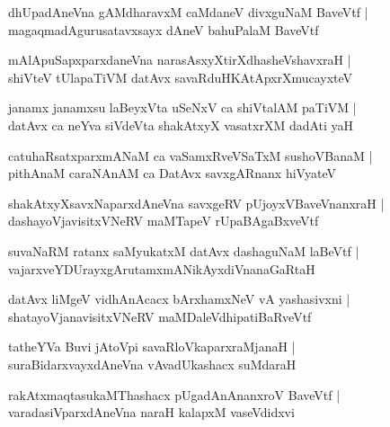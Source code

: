 \documentclass[twoside,12pt,openright]{book}
\newcounter{shloka}[chapter]
\begin{document}
\begin{shloka}%
dhUpadAneVna gAMdharavxM caMdaneV divxguNaM BaveVtf |\\
magaqmadAgurusatavxsayx dAneV bahuPalaM BaveVtf
\end{shloka}

\begin{shloka}%
mAlApuSapxparxdaneVna narasAsxyXtirXdhasheVshavxraH |\\
shiVteV tUlapaTiVM datAvx savaRduHKAtApxrXmucayxteV
\end{shloka}

\begin{shloka}%
janamx janamxsu laBeyxVta uSeNxV ca shiVtalAM paTiVM |\\
datAvx ca neYva siVdeVta shakAtxyX vasatxrXM dadAti yaH 
\end{shloka}

\begin{shloka}%
catuhaRsatxparxmANaM ca vaSamxRveVSaTxM sushoVBanaM |\\
pithAnaM caraNAnAM ca DatAvx savxgARnanx hiVyateV 
\end{shloka}

\begin{shloka}%
shakAtxyXsavxNaparxdAneVna savxgeRV pUjoyxVBaveVnanxraH |\\
dashayoVjavisitxVNeRV maMTapeV rUpaBAgaBxveVtf
\end{shloka}

\begin{shloka}%
suvaNaRM ratanx saMyukatxM datAvx dashaguNaM laBeVtf |\\
vajarxveYDUrayxgArutamxmANikAyxdiVnanaGaRtaH
\end{shloka}

\begin{shloka}%
datAvx liMgeV vidhAnAcacx bArxhamxNeV vA yashasivxni |\\
shatayoVjanavisitxVNeRV maMDaleVdhipatiBaRveVtf 
\end{shloka}

\begin{shloka}%
tatheYVa Buvi jAtoVpi savaRloVkaparxraMjanaH |\\
suraBidarxvayxdAneVna vAvadUkashacx suMdaraH 
\end{shloka}

\begin{shloka}%
rakAtxmaqtasukaMThashacx pUgadAnAnanxroV BaveVtf |\\
varadasiVparxdAneVna naraH kalapxM vaseVdidxvi
\end{shloka}
\end{document}

